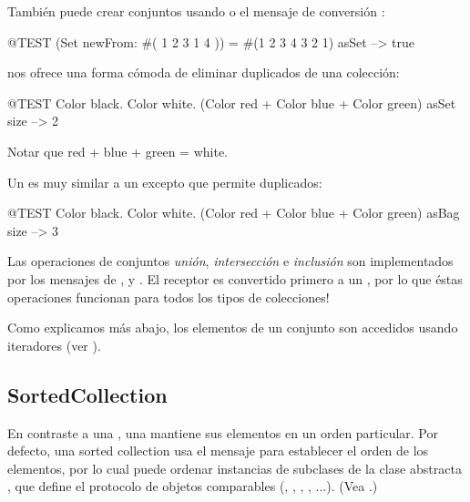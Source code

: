 \documentclass[a4paper,10pt,twoside]{book}
\begin{document}
Tambi\'en puede crear conjuntos usando  o el mensaje de conversi\'on :

\begin{code}{@TEST}
(Set newFrom: #( 1 2 3 1 4 )) = #(1 2 3 4 3 2 1) asSet --> true
\end{code}

 nos ofrece una forma c\'omoda de eliminar duplicados de una colecci\'on:
\begin{code}{@TEST}
{ Color black. Color white. (Color red + Color blue + Color green) } asSet size --> 2
\end{code}
\noindent
Notar que red + blue + green = white.

Un  es muy similar a un  excepto que permite duplicados:
\begin{code}{@TEST}
{ Color black. Color white. (Color red + Color blue + Color green) } asBag size --> 3
\end{code}

Las operaciones de conjuntos \emph{uni\'on}, \emph{intersecci\'on} e \emph{inclusi\'on} son implementados por los mensajes de   ,  y .
El receptor es convertido primero a un , por lo que \'estas operaciones funcionan para todos los tipos de colecciones!


Como explicamos m\'as abajo, los elementos de un conjunto son accedidos usando iteradores (ver ).

\subsection{SortedCollection}
En contraste a una , una  mantiene sus elementos en un orden particular. Por defecto, una sorted collection usa el mensaje  para establecer el orden de los elementos, por lo cual puede ordenar instancias de subclases de la clase abstracta , que define el protocolo de objetos comparables (, , , , ...).
(Vea .)
\end{document}

